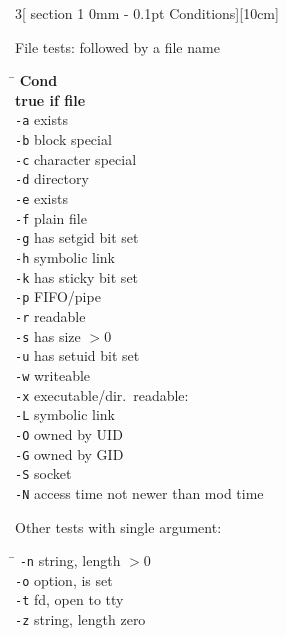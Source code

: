 \documentclass{article}
\makeatletter
\renewcommand{\section}{\@startsection
  {section}%
  {1}%
  {0mm}%
  {-\baselineskip}%
  {0.1pt}%
  {\normalfont\normalsize\scshape}} %
\newcommand\B[1]{\textbf{#1}}
\newcommand\T[1]{\texttt{#1}}
\makeatother
\begin{document}
\begin{multicols}{3}[\section{Conditions}][10cm]

File tests: followed by a file name
\begin{tabbing}
\hskip 20pt \= \kill
\B{Cond} \\
                \> \B{true if file} \\
\T{-a}          \> exists \\
\T{-b}          \> block special \\
\T{-c}          \> character special \\
\T{-d}          \> directory \\
\T{-e}          \> exists \\
\T{-f}          \> plain file \\
\T{-g}          \> has setgid bit set \\
\T{-h}          \> symbolic link \\
\T{-k}          \> has sticky bit set \\
\T{-p}          \> FIFO/pipe \\
\T{-r}          \> readable \\
\T{-s}          \> has size $>0$ \\
\T{-u}          \> has setuid bit set \\
\T{-w}          \> writeable \\
\T{-x}          \> executable/dir.\ readable: \\
\T{-L}          \> symbolic link \\
\T{-O}          \> owned by UID \\
\T{-G}          \> owned by GID \\
\T{-S}          \> socket \\
\T{-N}          \> access time not newer than mod time \\
\end{tabbing}

Other tests with single argument:
\begin{tabbing}
\hskip 20pt \= \kill
\T{-n}          \> string, length $>0$ \\
\T{-o}          \> option, is set \\
\T{-t}          \> fd, open to tty \\
\T{-z}          \> string, length zero \\
\end{tabbing}


\end{multicols}
\end{document}
